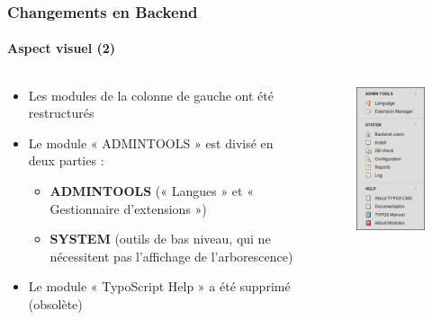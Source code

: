 
\begin{frame}[fragile]
	\frametitle{Changements en Backend}
	\framesubtitle{Aspect visuel (2)}

	\begin{columns}[T]

		\begin{column}{.5\textwidth}

			\begin{itemize}
				\item Les modules de la colonne de gauche ont été restructurés
				\item Le module « ADMINTOOLS » est divisé en deux parties :

					\begin{itemize}
						\item \textbf{ADMINTOOLS} (« Langues » et « Gestionnaire d'extensions »)
						\item \textbf{SYSTEM} (outils de bas niveau, qui ne nécessitent pas l'affichage de l'arborescence)
					\end{itemize}

				\item Le module « TypoScript Help » a été supprimé (obsolète)

			\end{itemize}

		\end{column}

		\begin{column}{.5\textwidth}
			\begin{figure}\vspace*{-0.4cm}
				\includegraphics[width=0.35\linewidth]{Images/BackendChanges/AdminTools.png}
			\end{figure}
		\end{column}

	\end{columns}

\end{frame}

